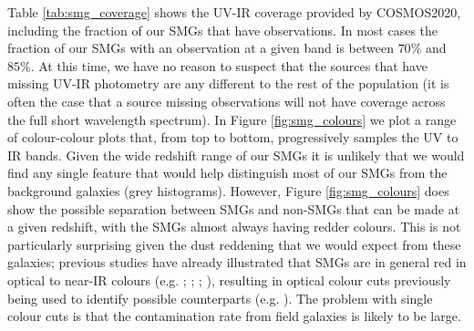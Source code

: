 Table \ref{tab:smg_coverage} shows the UV-IR coverage provided by COSMOS2020, including the fraction of our SMGs that have observations. In most cases the fraction of our SMGs with an observation at a given band is between $70\%$ and $85\%$. At this time, we have no reason to suspect that the sources that have missing UV-IR photometry are any different to the rest of the population (it is often the case that a source missing observations will not have coverage across the full short wavelength spectrum). In Figure \ref{fig:smg_colours} we plot a range of colour-colour plots that, from top to bottom, progressively samples the UV to IR bands. Given the wide redshift range of our SMGs it is unlikely that we would find any single feature that would help distinguish most of our SMGs from the background galaxies (grey histograms). However, Figure \ref{fig:smg_colours} does show the possible separation between SMGs and non-SMGs that can be made at a given redshift, with the SMGs almost always having redder colours. This is not particularly surprising given the dust reddening that we would expect from these galaxies; previous studies have already illustrated that SMGs are in general red in optical to near-IR colours (e.g. \citealt{Smail_2002}; \citealt{Dannerbauer_2004}; \citealt{Wang_2012}; \citealt{Chen_2016}), resulting in optical colour cuts previously being used to identify possible counterparts (e.g. \citealt{Michalowski_2012b}). The problem with single colour cuts is that the contamination rate from field galaxies is likely to be large.

